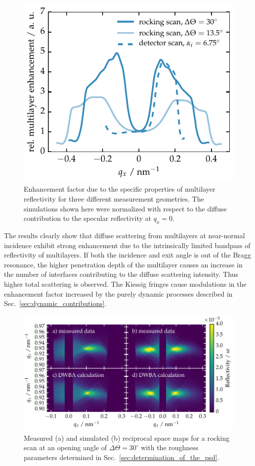\begin{figure}[htbp]
	\includegraphics{img/PTB17_multilayer_enhancement_factor} \caption{Enhancement factor due to the specific properties of multilayer reflectivity for three different measurement geometries. The simulations shown here were normalized with respect to the diffuse contribution to the specular reflectivity at $q_x=0$.} \label{fig:MultilayerInfluence} 
\end{figure}

The results clearly show that diffuse scattering from multilayers at near-normal incidence exhibit strong enhancement due to the intrinsically limited bandpass of reflectivity of multilayers. If both the incidence and exit angle is out of the Bragg resonance, the higher penetration depth of the multilayer causes an increase in the number of interfaces contributing to the diffuse scattering intensity. Thus higher total scattering is observed. The Kiessig fringes cause modulations in the enhancement factor increased by the purely dynamic processes described in Sec.~\ref{sec:dynamic_contributions}.

\begin{figure}[htbp]
        \includegraphics[width=
        \textwidth]{img/PTB17_diffuse_simulation_vs_measurement} \caption{Measured (a) and simulated (b) reciprocal space maps for a rocking scan at an opening angle of $\Delta\Theta=30^\circ$ with the roughness parameters determined in Sec.~\ref{sec:determination_of_the_psd}.} \label{fig:comparisonWithTheory} 
\end{figure}

